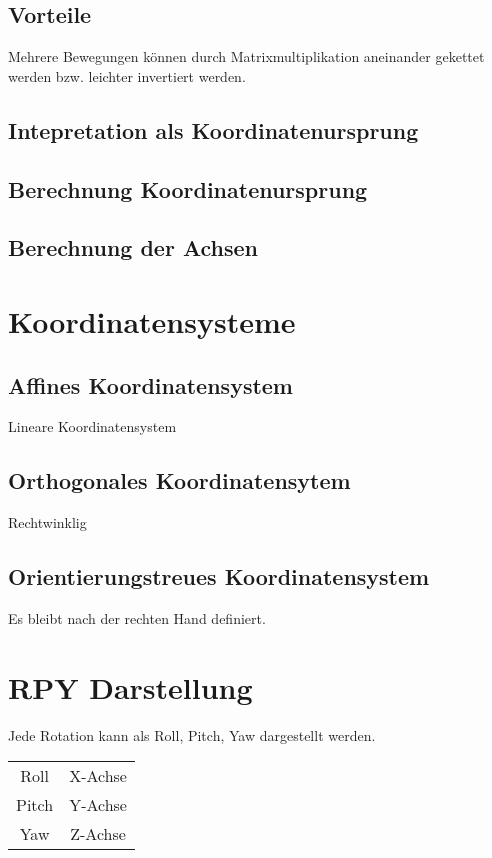 \subsection{Vorteile}
	Mehrere Bewegungen können durch Matrixmultiplikation aneinander gekettet werden bzw. leichter invertiert werden.

\subsection{Intepretation als Koordinatenursprung}

\subsection{Berechnung Koordinatenursprung}

\subsection{Berechnung der Achsen}

\section{Koordinatensysteme}

\subsection{Affines Koordinatensystem}
Lineare Koordinatensystem

\subsection{Orthogonales Koordinatensytem}
Rechtwinklig

\subsection{Orientierungstreues Koordinatensystem}
Es bleibt nach der rechten Hand definiert.

\section{RPY Darstellung}
Jede Rotation kann als Roll, Pitch, Yaw dargestellt werden.

\begin{tabular}{cc}
	Roll & X-Achse \\
	Pitch & Y-Achse \\
	Yaw & Z-Achse
\end{tabular}


